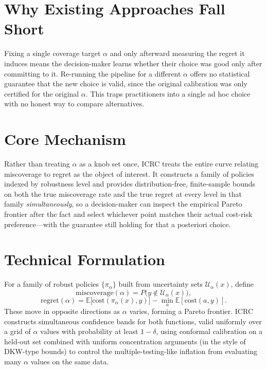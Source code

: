 \documentclass[10pt,twocolumn]{article}
\begin{document}
\section{Why Existing Approaches Fall Short}

Fixing a single coverage target $\alpha$ and only afterward measuring
the regret it induces means the decision-maker learns whether their
choice was good only after committing to it. Re-running the pipeline
for a different $\alpha$ offers no statistical guarantee that the new
choice is valid, since the original calibration was only certified for
the original $\alpha$. This traps practitioners into a single ad hoc
choice with no honest way to compare alternatives.

\section{Core Mechanism}

Rather than treating $\alpha$ as a knob set once, ICRC treats the
entire curve relating miscoverage to regret as the object of interest.
It constructs a family of policies indexed by robustness level and
provides distribution-free, finite-sample bounds on both the true
miscoverage rate and the true regret at every level in that family
\emph{simultaneously}, so a decision-maker can inspect the empirical
Pareto frontier after the fact and select whichever point matches their
actual cost-risk preference---with the guarantee still holding for that
a posteriori choice.

\section{Technical Formulation}

For a family of robust policies $\{\pi_\alpha\}$ built from uncertainty
sets $\mathcal{U}_\alpha(x)$, define
\[
\text{miscoverage}(\alpha) = P\big(y \notin \mathcal{U}_\alpha(x)\big),
\]
\[
\text{regret}(\alpha) = \mathbb{E}\big[\text{cost}(\pi_\alpha(x), y)\big]
  - \min_{a} \mathbb{E}[\text{cost}(a, y)].
\]
These move in opposite directions as $\alpha$ varies, forming a Pareto
frontier. ICRC constructs simultaneous confidence bands for both
functions, valid uniformly over a grid of $\alpha$ values with
probability at least $1-\delta$, using conformal calibration on a
held-out set combined with uniform concentration arguments (in the
style of DKW-type bounds) to control the multiple-testing-like
inflation from evaluating many $\alpha$ values on the same data.
\end{document}
